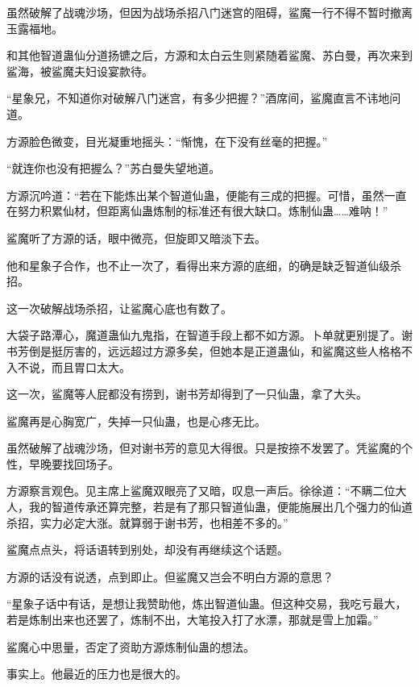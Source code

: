 
\begin{this_body}



虽然破解了战魂沙场，但因为战场杀招八门迷宫的阻碍，鲨魔一行不得不暂时撤离玉露福地。

和其他智道蛊仙分道扬镳之后，方源和太白云生则紧随着鲨魔、苏白曼，再次来到鲨海，被鲨魔夫妇设宴款待。

“星象兄，不知道你对破解八门迷宫，有多少把握？”酒席间，鲨魔直言不讳地问道。

方源脸色微变，目光凝重地摇头：“惭愧，在下没有丝毫的把握。”

“就连你也没有把握么？”苏白曼失望地道。

方源沉吟道：“若在下能炼出某个智道仙蛊，便能有三成的把握。可惜，虽然一直在努力积累仙材，但距离仙蛊炼制的标准还有很大缺口。炼制仙蛊……难呐！”

鲨魔听了方源的话，眼中微亮，但旋即又暗淡下去。

他和星象子合作，也不止一次了，看得出来方源的底细，的确是缺乏智道仙级杀招。

这一次破解战场杀招，让鲨魔心底也有数了。

大袋子路潭心，魔道蛊仙九鬼指，在智道手段上都不如方源。卜单就更别提了。谢书芳倒是挺厉害的，远远超过方源多矣，但她本是正道蛊仙，和鲨魔这些人格格不入不说，而且胃口太大。

这一次，鲨魔等人屁都没有捞到，谢书芳却得到了一只仙蛊，拿了大头。

鲨魔再是心胸宽广，失掉一只仙蛊，也是心疼无比。

虽然破解了战魂沙场，但对谢书芳的意见大得很。只是按捺不发罢了。凭鲨魔的个性，早晚要找回场子。

方源察言观色。见主席上鲨魔双眼亮了又暗，叹息一声后。徐徐道：“不瞒二位大人，我的智道传承还算完整，若是有了那只智道仙蛊，便能施展出几个强力的仙道杀招，实力必定大涨。就算弱于谢书芳，也相差不多的。”

鲨魔点点头，将话语转到别处，却没有再继续这个话题。

方源的话没有说透，点到即止。但鲨魔又岂会不明白方源的意思？

“星象子话中有话，是想让我赞助他，炼出智道仙蛊。但这种交易，我吃亏最大，若是炼制出来也还罢了，炼制不出，大笔投入打了水漂，那就是雪上加霜。”

鲨魔心中思量，否定了资助方源炼制仙蛊的想法。

事实上。他最近的压力也是很大的。


\end{this_body}
